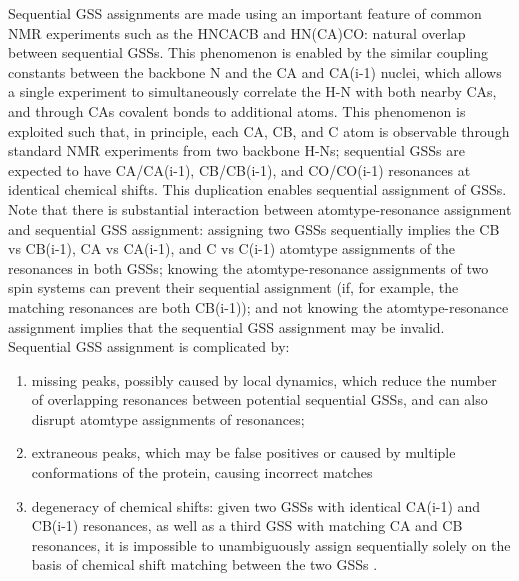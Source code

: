 Sequential GSS assignments are made using an important feature of common NMR 
experiments such as the HNCACB and HN(CA)CO: natural overlap between 
sequential GSSs.  This phenomenon is enabled by the similar coupling 
constants between the backbone N and the CA and CA(i-1) nuclei, which allows 
a single experiment to simultaneously correlate the H-N with both nearby CAs, 
and through CAs covalent bonds to additional atoms.  This phenomenon is 
exploited such that, in principle, each CA, CB, and C atom is observable 
through standard NMR experiments from two backbone H-Ns;  sequential GSSs 
are expected to have CA/CA(i-1), CB/CB(i-1), and CO/CO(i-1) resonances at 
identical chemical shifts.  This duplication enables sequential assignment 
of GSSs.  Note that there is substantial interaction between atomtype-resonance 
assignment and sequential GSS assignment: assigning two GSSs sequentially 
implies the CB vs CB(i-1), CA vs CA(i-1), and C vs C(i-1) atomtype assignments 
of the resonances in both GSSs; knowing the atomtype-resonance assignments of 
two spin systems can prevent their sequential assignment (if, for example, the 
matching resonances are both CB(i-1)); and not knowing the atomtype-resonance 
assignment implies that the sequential GSS assignment may be invalid.  
Sequential GSS assignment is complicated by: 
\begin{enumerate}
  \item missing peaks, possibly caused 
  by local dynamics, which reduce the number of overlapping resonances between 
  potential sequential GSSs, and can also disrupt atomtype assignments of 
  resonances; 
  \item extraneous peaks, which may be false positives or caused by 
  multiple conformations of the protein, causing incorrect matches
  \item degeneracy of chemical shifts:  given two GSSs with identical CA(i-1) 
  and CB(i-1) resonances, as well as a third GSS with matching CA and CB 
  resonances, it is impossible to unambiguously assign sequentially solely 
  on the basis of chemical shift matching between the two GSSs 
  \cite{autoassign1997}.
\end{enumerate}

